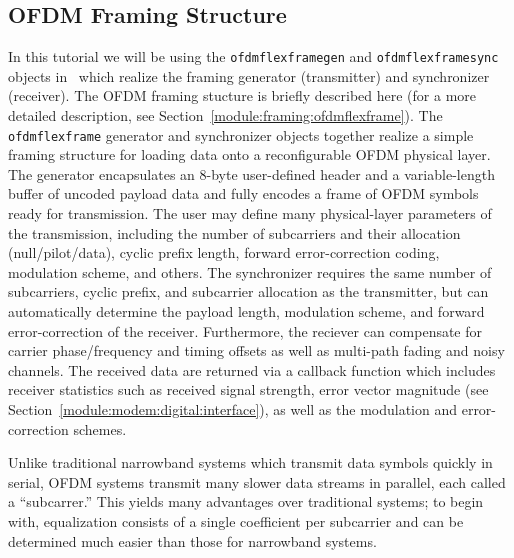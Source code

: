 %
%
\subsection{OFDM Framing Structure}
\label{tutorial:ofdmflexframe:structure}
%
In this tutorial we will be using the {\tt ofdmflexframegen} and
{\tt ofdmflexframesync} objects in \liquid\ which realize the
framing generator (transmitter) and synchronizer (receiver).
The OFDM framing stucture is briefly described here
(for a more detailed description, see
Section~\ref{module:framing:ofdmflexframe}).
The {\tt ofdmflexframe} generator and synchronizer objects
together realize a simple framing structure
for loading data onto a reconfigurable OFDM physical layer.
The generator encapsulates an 8-byte user-defined header
and a variable-length buffer of uncoded payload data
and fully encodes a frame of OFDM symbols ready for transmission.
The user may define many physical-layer parameters of the transmission,
including
  the number of subcarriers and their allocation (null/pilot/data),
  cyclic prefix length,
  forward error-correction coding,
  modulation scheme,
  and others.
The synchronizer requires the same number of subcarriers, cyclic prefix,
and subcarrier allocation as the transmitter, but can automatically
determine the payload length, modulation scheme, and forward
error-correction of the receiver.
Furthermore, the reciever can compensate for carrier phase/frequency and
timing offsets as well as multi-path fading and noisy channels.
The received data are returned via a callback function which includes
receiver statistics such as received signal strength, error vector
magnitude (see Section~\ref{module:modem:digital:interface}),
as well as the modulation and error-correction schemes.

Unlike traditional narrowband systems which transmit data symbols
quickly in serial,
OFDM systems transmit many slower data streams in parallel, each called
a ``subcarrer.''
This yields many advantages over traditional systems;
to begin with, equalization consists of a single coefficient per
subcarrier and can be determined much easier than those for narrowband
systems.


%
%
